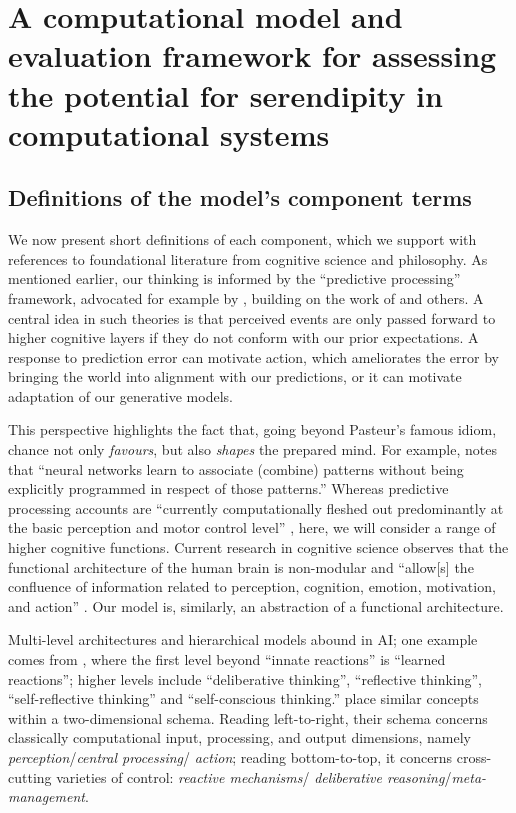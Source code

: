 \section{A computational model and evaluation framework for assessing the potential for serendipity in computational systems} \label{sec:our-model}

\subsection{Definitions of the model's component terms} \label{sec:modelTerms}

We now present short definitions of each component, which we support
with references to foundational literature from cognitive science and
philosophy.  As mentioned earlier, our thinking is informed by the
``predictive processing'' framework, advocated for example by
\citet{clark2013whatever}, building on the work of
\citet{friston2009free} and others.  A central idea in such theories
is that perceived events are only passed forward to higher cognitive
layers if they do not conform with our prior expectations.  A response
to prediction error can motivate action, which ameliorates the error
by bringing the world into alignment with our predictions, or it can
motivate adaptation of our generative models.

This perspective highlights the fact that, going beyond Pasteur's
famous idiom, chance not only \emph{favours}, but also \emph{shapes}
the prepared mind.  For example, \citet[p.~137]{boden} notes that
``neural networks learn to associate (combine) patterns without being
explicitly programmed in respect of those patterns.''  Whereas
predictive processing accounts are ``currently computationally fleshed
out predominantly at the basic perception and motor control level''
\cite{KWISTHOUT201784}, here, we will consider a range of higher
cognitive functions.  Current research in cognitive
science observes that the functional architecture of the
human brain is non-modular and ``allow[s] the confluence
of information related to perception, cognition, emotion, motivation,
and action'' \cite[p.~357]{Pessoa2017}.  Our model is, similarly, an
abstraction of a functional architecture.

Multi-level architectures and hierarchical models abound in AI; one
example comes from \citet{singh2005architecture}, where the first
level beyond ``innate reactions'' is ``learned reactions''; higher
levels include ``deliberative thinking'', ``reflective thinking'',
``self-reflective thinking'' and ``self-conscious thinking.''
\citet{sloman2002framework} place similar concepts within a
two-dimensional schema.  Reading left-to-right, their schema concerns
classically computational input, processing, and output dimensions,
namely \emph{perception}\slash \emph{central processing}\slash
\emph{action}; reading bottom-to-top, it concerns cross-cutting
varieties of control: \emph{reactive mechanisms}\slash
\emph{deliberative reasoning}\slash \emph{meta-management}.

